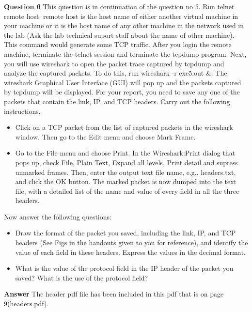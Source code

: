\documentclass[14pt]{extarticle}
\begin{document}
    \noindent
    \textbf{\large Question 6}
    This question is in continuation of the question no 5. Run telnet remote host. remote host is the host
name of either another virtual machine in your machine or it is the host name of any other machine in
the network used in the lab (Ask the lab technical suport staff about the name of other machine). This
command would generate some TCP traffic. After you login the remote machine, terminate the telnet
session and terminate the tcpdump program.
Next, you will use wireshark to open the packet trace captured by tcpdump and analyze the captured
packets. To do this, run wireshark -r exe5.out \&. The wireshark Graphical User Interface (GUI) will
pop up and the packets captured by tcpdump will be displayed. For your report, you need to save any
one of the packets that contain the link, IP, and TCP headers. Carry out the following instructions.
    \begin{itemize}
        \item Click on a TCP packet from the list of captured packets in the wireshark window. Then go to the
        Edit menu and choose Mark Frame.
        
        \item Go to the File menu and choose Print. In the Wireshark:Print dialog that pops up, check File,
       Plain Text, Expand all levels, Print detail and supress unmarked frames. Then, enter the output
       text file name, e.g., headers.txt, and click the OK button. The marked packet is now dumped into
       the text file, with a detailed list of the name and value of every field in all the three headers.
    \end{itemize}
    Now answer the following questions:
    \begin{itemize}
        \item Draw the format of the packet you saved, including the link, IP, and TCP headers (See Figs in the
        handouts given to you for reference), and identify the value of each field in these headers. Express
        the values in the decimal format. 
        \item What is the value of the protocol field in the IP header of the packet you saved? What is the use
        of the protocol field?
    \end{itemize}
    \textbf{\large Answer}
    The header pdf file has been included in this pdf that is on page 9(headers.pdf).
\end{document}
